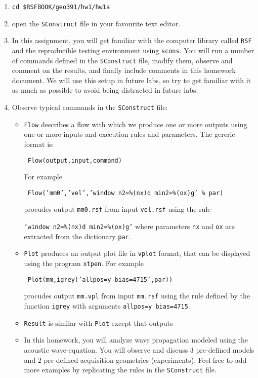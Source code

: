 \begin{enumerate}

\item \texttt{cd \$RSFBOOK/geo391/hw1/hw1a}

\item open the \texttt{SConstruct} file in your favourite text editor.

\item In this assignment, you will get familiar with 
the computer library called \texttt{RSF} and the reproducible testing
environment using \texttt{scons}.
You will run a number of commands defined in the 
\texttt{SConstruct} file, modify them, 
observe and comment on the results, and finally include comments
in this homework document.
We will use this setup in future labs, so try to get familiar with
it as much as possible to avoid being distracted in future labs.

\item Observe typical commands in the \texttt{SConstruct} file:
\begin{itemize}
\item \texttt{Flow} describes a flow with which we produce 
one or more outputs using one or more inputs and execution rules and
parameters. The gereric format is:
\par
\texttt{ Flow(output,input,command) }
\par
For example
\par
\texttt{ Flow('mm0','vel','window n2=\%(nx)d min2=\%(ox)g' \% par)}
\par
procudes output \texttt{mm0.rsf} from input \texttt{vel.rsf} using the rule
\par
\texttt{'window n2=\%(nx)d min2=\%(ox)g'} where parameters
\texttt{nx} and \texttt{ox} are extracted from the dictionary \texttt{par}.

\item \texttt{Plot} produces an output plot file 
in \texttt{vplot} format, that can be displayed using the program 
\texttt{xtpen}.
For example
\par
\texttt{ Plot(mm,igrey('allpos=y bias=4715',par))}
\par
procudes output \texttt{mm.vpl} from input 
\texttt{mm.rsf} using the rule defined by the function 
\texttt{igrey} with arguments \texttt{allpos=y bias=4715}.

\item \texttt{Result} is similar with \texttt{Plot} except
that outputs

\item In this homework, you will analyze wave propagation modeled
using the acoustic wave-equation. 
You will observe and discuss $3$ pre-defined models and 
$2$ pre-defined acquisition geometries (experiments).
Feel free to add more examples by replicating the rules in the
\texttt{SConstruct} file.


\end{itemize}
\end{enumerate}

